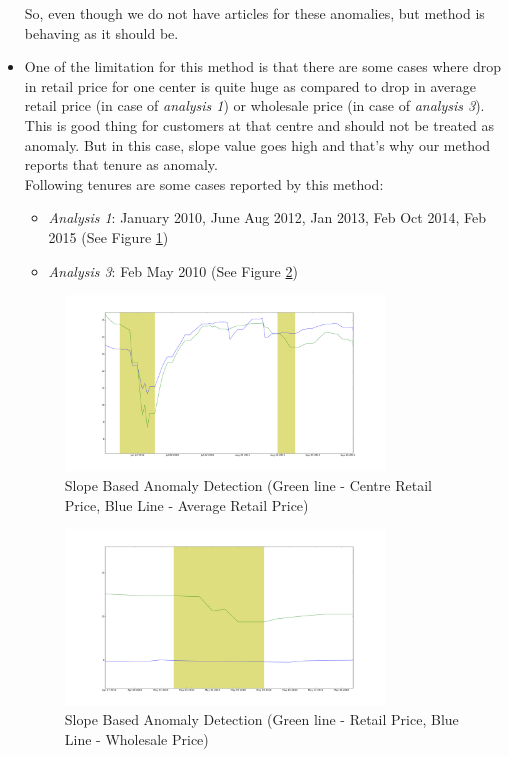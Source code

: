 \begin{itemize}
			
			
			So, even though we do not have articles for these anomalies, but method is behaving as it should be. 			
			
			\item One of the limitation for this method is that there are some cases where drop in retail price for one center is quite huge as compared to drop in average retail price (in case of \textit{analysis 1}) or wholesale price (in case of \textit{analysis 3}). This is good thing for customers at that centre and should not be treated as anomaly. But in this case, slope value goes high and that's why our method reports that tenure as anomaly.\\
			Following tenures are some cases reported by this method:
			\begin{itemize}
				\item \textit{Analysis 1}: January 2010, June Aug 2012, Jan 2013, Feb Oct 2014, Feb 2015  (See Figure \ref{fig:12112})
				\item \textit{Analysis 3}: Feb May 2010  (See Figure \ref{fig:12132})
			\end{itemize}
			
			\begin{figure}[H]
		    	\centering
  		    	\includegraphics[width=0.8\textwidth]{graphs/12112.png}
		    	\caption{Slope Based Anomaly Detection (Green line - Centre Retail Price, Blue Line - Average Retail Price)}
		    	\label{fig:12112}
			\end{figure}
			
			\begin{figure}[H]
		    	\centering
  		    	\includegraphics[width=0.8\textwidth]{graphs/12132.png}
		    	\caption{Slope Based Anomaly Detection (Green line - Retail Price, Blue Line - Wholesale Price)}
		    	\label{fig:12132}
			\end{figure}
						

\end{itemize}
